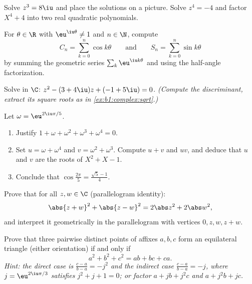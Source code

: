 \begin{exercise}[$\star$]\label{exo:b1:complex:5}
Solve $z^3 = 8\iu$ and place the solutions on a picture. Solve
$z^4 = -4$ and factor $X^4 + 4$ into two real quadratic polynomials.
\end{exercise}

\begin{exercise}[$\star\star$]\label{exo:b1:complex:6}
For $\theta \in \R$ with $\eu^{\iu\theta} \neq 1$ and $n \in \N$,
compute
\[
C_n = \sum_{k=0}^{n} \cos k\theta
\qquad\text{and}\qquad
S_n = \sum_{k=0}^{n} \sin k\theta
\]
by summing the geometric series $\sum_k \eu^{\iu k\theta}$ and using
the half-angle factorization.
\end{exercise}

\begin{exercise}[$\star\star$]\label{exo:b1:complex:7}
Solve in $\C$: $z^2 - (3 + 4\iu) z + (-1 + 5\iu) = 0$. \emph{(Compute
the discriminant, extract its square roots as in
\cref{ex:b1:complex:sqrt}.)}
\end{exercise}

\begin{exercise}[$\star\star$]\label{exo:b1:complex:8}
Let $\omega = \eu^{2\iu\pi/5}$.
\begin{enumerate}
  \item Justify $1 + \omega + \omega^2 + \omega^3 + \omega^4 = 0$.
  \item Set $u = \omega + \omega^4$ and $v = \omega^2 + \omega^3$.
        Compute $u + v$ and $uv$, and deduce that $u$ and $v$ are the
        roots of $X^2 + X - 1$.
  \item Conclude that $\cos\frac{2\pi}{5} = \frac{\sqrt 5 - 1}{4}$.
\end{enumerate}
\end{exercise}

\begin{exercise}[$\star\star$]\label{exo:b1:complex:9}
Prove that for all $z, w \in \C$ (parallelogram identity):
\[
\abs{z + w}^2 + \abs{z - w}^2 = 2\abs z^2 + 2\abs w^2 ,
\]
and interpret it geometrically in the parallelogram with vertices $0,
z, w, z + w$.
\end{exercise}

\begin{exercise}[$\star\star\star$]\label{exo:b1:complex:10}
Prove that three pairwise distinct points of affixes $a, b, c$ form an
equilateral triangle (either orientation) if and only if
\[
a^2 + b^2 + c^2 = ab + bc + ca .
\]
\emph{Hint: the direct case is $\frac{c-a}{b-a} = -j^2$ and the
indirect case $\frac{c-a}{b-a} = -j$, where $j = \eu^{2\iu\pi/3}$
satisfies $j^2 + j + 1 = 0$; or factor $a + jb + j^2c$ and $a + j^2 b
+ jc$.}
\end{exercise}

